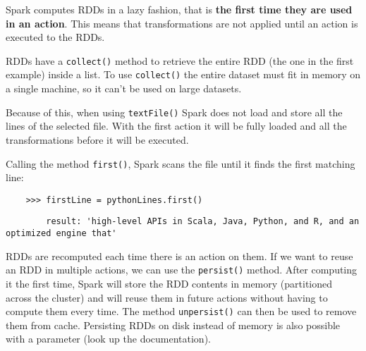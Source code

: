 Spark computes RDDs in a lazy fashion, that is \textbf{the first time they are used in an action}. This means that transformations are not applied until an action is executed to the RDDs.

RDDs have a \texttt{collect()} method to retrieve the entire RDD (the one in the first example) inside a list. To use \texttt{collect()} the entire dataset must fit in memory on a single machine, so it can't be used on large datasets.

Because of this, when using \texttt{textFile()} Spark does not load and store all the lines of the selected file. With the first action it will be fully loaded and all the transformations before it will be executed.


Calling the method \texttt{first()}, Spark scans the file until it finds the first matching line:

\begin{lstlisting}
    >>> firstLine = pythonLines.first()
\end{lstlisting}

\begin{lstlisting}
        result: 'high-level APIs in Scala, Java, Python, and R, and an optimized engine that'
\end{lstlisting}


RDDs are recomputed each time there is an action on them. If we want to reuse an RDD in multiple actions, we can use the \texttt{persist()} method.
After computing it the first time, Spark will store the RDD contents in memory (partitioned across the cluster) and will reuse them in future actions without having to compute them every time. The method \texttt{unpersist()} can then be used to remove them from cache.
Persisting RDDs on disk instead of memory is also possible with a parameter (look up the documentation).
